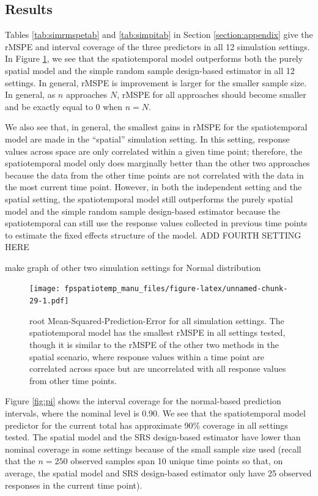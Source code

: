 \documentclass[]{interact}
\theoremstyle{plain}%
\theoremstyle{definition}
\theoremstyle{remark}
\begin{document}
\subsection{Results}

Tables \ref{tab:simrmspetab} and \ref{tab:simpitab} in Section
\ref{section:appendix} give the rMSPE and interval coverage of the three
predictors in all 12 simulation settings. In Figure \ref{fig:rmspe}, we
see that the spatiotemporal model outperforms both the purely spatial
model and the simple random sample design-based estimator in all 12
settings. In general, rMSPE is improvement is larger for the smaller
sample size. In general, as \(n\) approaches \(N\), rMSPE for all
approaches should become smaller and be exactly equal to 0 when
\(n = N\).

We also see that, in general, the smallest gains in rMSPE for the
spatiotemporal model are made in the ``spatial'' simulation setting. In
this setting, response values across space are only correlated within a
given time point; therefore, the spatiotemporal model only does
marginally better than the other two approaches because the data from
the other time points are not correlated with the data in the most
current time point. However, in both the independent setting and the
spatial setting, the spatiotemporal model still outperforms the purely
spatial model and the simple random sample design-based estimator
because the spatiotemporal can still use the response values collected
in previous time points to estimate the fixed effects structure of the
model. ADD FOURTH SETTING HERE

make graph of other two simulation settings for Normal distribution

\begin{figure}
\centering
\texttt{[image: fpspatiotemp\_manu\_files/figure-latex/unnamed-chunk-29-1.pdf]}
\caption{\label{fig:rmspe} root Mean-Squared-Prediction-Error for all
simulation settings. The spatiotemporal model has the smallest rMSPE in
all settings tested, though it is similar to the rMSPE of the other two
methods in the spatial scenario, where response values within a time
point are correlated across space but are uncorrelated with all response
values from other time points.}
\end{figure}

Figure \ref{fig:pi} shows the interval coverage for the normal-based
prediction intervals, where the nominal level is 0.90. We see that the
spatiotemporal model predictor for the current total has approximate
90\% coverage in all settings tested. The spatial model and the SRS
design-based estimator have lower than nominal coverage in some settings
because of the small sample size used (recall that the \(n = 250\)
observed samples span 10 unique time points so that, on average, the
spatial model and SRS design-based estimator only have 25 observed
responses in the current time point).
\end{document}
